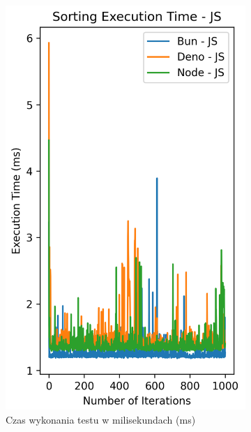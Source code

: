 \begin{figure}[H]
  \centering
  \begin{subfigure}[b]{0.4\textwidth}
    \centering
    \includegraphics[width=\textwidth]{Figures/sorting/sorting_bubble_1000_1000_js_time.png}
    \caption{Czas wykonania testu w milisekundach (ms)}
    \label{fig:bubble_sorting_e2_time}
  \end{subfigure}
  \begin{subfigure}[b]{0.4\textwidth}
    \centering

\end{subfigure}
\end{figure}
